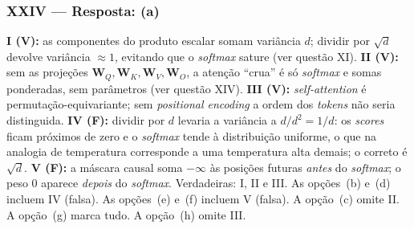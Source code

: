 \documentclass{dlproblemset}
\begin{document}
\subsubsection*{XXIV — Resposta: (a)}
\textbf{I (V):} as componentes do produto escalar somam variância $d$; dividir por
$\sqrt{d}$ devolve variância $\approx 1$, evitando que o \textit{softmax} sature (ver
questão XI).
\textbf{II (V):} sem as projeções $\mathbf{W}_Q, \mathbf{W}_K, \mathbf{W}_V, \mathbf{W}_O$,
a atenção ``crua'' é só \textit{softmax} e somas ponderadas, sem parâmetros (ver
questão XIV).
\textbf{III (V):} \textit{self-attention} é permutação-equivariante; sem
\textit{positional encoding} a ordem dos \textit{tokens} não seria distinguida.
\textbf{IV (F):} dividir por $d$ levaria a variância a $d/d^2 = 1/d$: os \textit{scores}
ficam próximos de zero e o \textit{softmax} tende à distribuição uniforme, o que na
analogia de temperatura corresponde a uma temperatura alta demais; o correto é $\sqrt{d}$.
\textbf{V (F):} a máscara causal soma $-\infty$ às posições futuras \emph{antes} do
\textit{softmax}; o peso $0$ aparece \emph{depois} do \textit{softmax}.
Verdadeiras: I, II e III.
As opções~(b) e~(d) incluem IV (falsa). As opções~(e) e~(f) incluem V (falsa). A
opção~(c) omite II. A opção~(g) marca tudo. A opção~(h) omite III.

\end{document}

